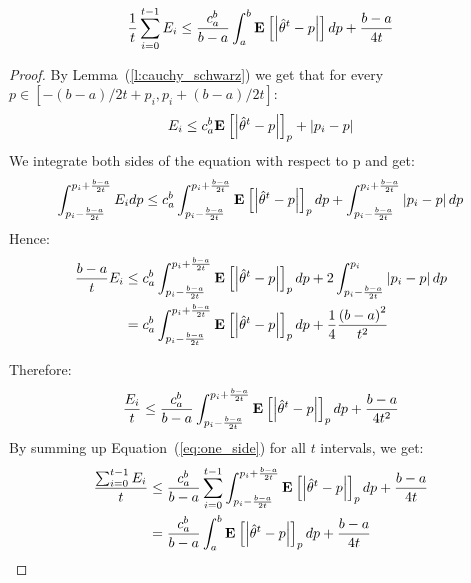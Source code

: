 \begin{lemma}\label{l:upper}
  \[
  \frac{1}{t} \sum_{i=0}^{t-1}
  E_i \leq
  \frac{c_a^b}{b-a} \int_a^b \Exp{\lp|\hat{\theta}^t-p\rp|} dp +
  \frac{b-a}{4t}
\]
\end{lemma}
\begin{proof}
  By Lemma~(\ref{l:cauchy_schwarz}) we get that
  for every $p\in [-(b-a)/{2t} + p_i , p_i + (b-a)/{2t}]$:
  $$E_i \leq  c_a^b\Exp{\lp|\hat{\theta}^t-p\rp|}_p + \lp|p_i - p\rp|$$
  We integrate both sides of the equation with respect to p and get:
  \[
  \int_{p_i - \frac{b-a}{2t}}^{p_i + \frac{b-a}{2t}} E_i dp \leq c_a^b
  \int_{p_i - \frac{b-a}{2t}}^{p_i + \frac{b-a}{2t}}
  \Exp{\lp|\hat{\theta}^t-p\rp|}_p dp +
  \int_{p_i - \frac{b-a}{2t}}^{p_i + \frac{b-a}{2t}}\lp|p_i - p\rp| dp
\]
  Hence:
  \begin{align*}
    \frac{b-a}{t} E_i
    &\leq
    c_a^b\int_{p_i - \frac{b-a}{2t}}^{p_i+ \frac{b-a}{2t}}
    \Exp{\lp|\hat{\theta}^t-p\rp|}_p dp +
    2\int_{p_i - \frac{b-a}{2t}}^{p_i}\lp|p_i-p\rp|dp\\
    &= c_a^b\int_{p_i - \frac{b-a}{2t}}^{p_i + \frac{b-a}{2t}}
    \Exp{\lp|\hat{\theta}^t-p\rp|}_p
    dp + \frac{1}{4} \frac{\lp(b-a\rp)^2}{t^2}
  \end{align*}

  Therefore:
  \begin{equation}\label{eq:one_side}
    \frac{E_i}{t} \leq \frac{c_a^b}{b-a}
    \int_{p_i - \frac{b-a}{2t}}^{p_i + \frac{b-a}{2t}}
    \Exp{\lp|\hat{\theta}^t-p\rp|}_p dp + \frac{b-a}{4t^2}
  \end{equation}
  By summing up Equation~(\ref{eq:one_side}) for all $t$ intervals, we get:
  \begin{align*}
    \frac{\sum_{i=0}^{t-1} E_i}{t} &\leq \frac{c_a^b}{b-a} \sum_{i=0}^{t-1}
    \int_{p_i - \frac{b-a}{2t}}^{p_i+ \frac{b-a}{2t}}
    \Exp{\lp|\hat{\theta}^t-p\rp|}_p dp + \frac{b-a}{4t}\\
    &=
    \frac{c_a^b}{b-a} \int_a^b \Exp{\lp|\hat{\theta}^t-p\rp|}_p dp + \frac{b-a}{4t}
  \end{align*}
\end{proof}
